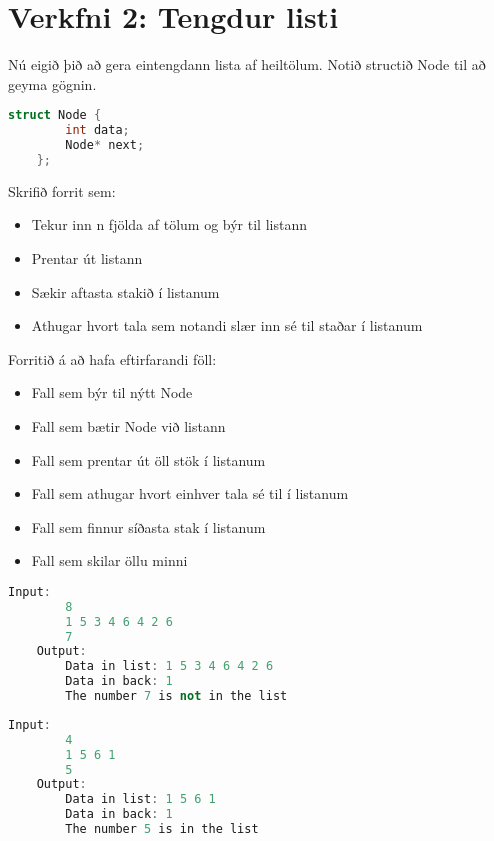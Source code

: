 \documentclass[11pt,a4paper]{article}
\begin{document}
\section*{Verkfni 2: Tengdur listi}
Nú eigið þið að gera eintengdann lista af heiltölum. Notið structið Node til að geyma gögnin.

\begin{lstlisting}[language=C++, caption = Example]
	struct Node {
		int data;
		Node* next;
	};
\end{lstlisting}

Skrifið forrit sem:
\begin{itemize}
	\item Tekur inn n fjölda af tölum og býr til listann
	\item Prentar út listann
	\item Sækir aftasta stakið í listanum
	\item Athugar hvort tala sem notandi slær inn sé til staðar í listanum
\end{itemize}

Forritið á að hafa eftirfarandi föll:
\begin{itemize}
	\item Fall sem býr til nýtt Node
	\item Fall sem bætir Node við listann
	\item Fall sem prentar út öll stök í listanum
	\item Fall sem athugar hvort einhver tala sé til í listanum
	\item Fall sem finnur síðasta stak í listanum
	\item Fall sem skilar öllu minni
\end{itemize}

\begin{lstlisting}[language=C++, caption=Dæmi um input og output]
	Input:
		8
		1 5 3 4 6 4 2 6
		7
	Output:
		Data in list: 1 5 3 4 6 4 2 6
		Data in back: 1
		The number 7 is not in the list
\end{lstlisting}
\pagebreak
\begin{lstlisting}[language=C++, caption=Dæmi um input og output]
	Input:
		4
		1 5 6 1
		5
	Output:
		Data in list: 1 5 6 1
		Data in back: 1
		The number 5 is in the list
		
\end{lstlisting}
\end{document}
